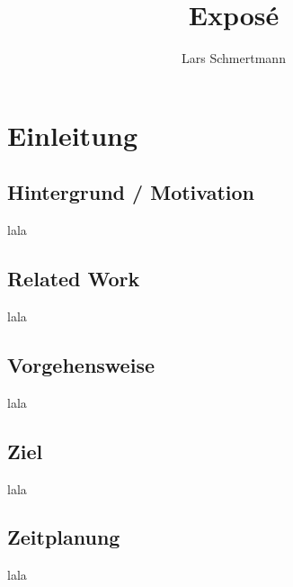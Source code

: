 \documentclass[a4paper,10pt]{report}
\title{Exposé}
\author{Lars Schmertmann}
\begin{document}
\maketitle


\tableofcontents
\clearpage

\chapter{Einleitung}

\section{Hintergrund / Motivation}
lala

\section{Related Work}
lala

\section{Vorgehensweise}
lala

\section{Ziel}
lala

\section{Zeitplanung}
lala


\nocite{*}


\end{document}
